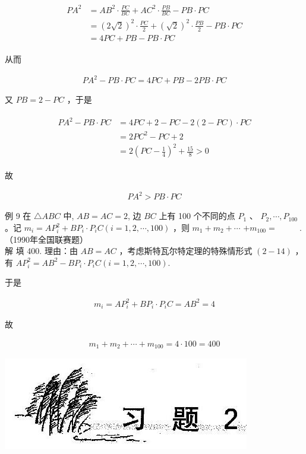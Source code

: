 \documentclass[10pt]{article}
\begin{document}
\begin{align*}
\begin{aligned}
P A^{2} & =A B^{2} \cdot \frac{P C}{B C}+A C^{2} \cdot \frac{P B}{B C}-P B \cdot P C \\
& =(2 \sqrt{2})^{2} \cdot \frac{P C}{2}+(\sqrt{2})^{2} \cdot \frac{P B}{2}-P B \cdot P C \\
& =4 P C+P B-P B \cdot P C
\end{aligned}
\end{align*}

从而

\begin{align*}
P A^{2}-P B \cdot P C=4 P C+P B-2 P B \cdot P C
\end{align*}

又 $P B=2-P C$ ，于是

\begin{align*}
\begin{aligned}
P A^{2}-P B \cdot P C & =4 P C+2-P C-2(2-P C) \cdot P C \\
& =2 P C^{2}-P C+2 \\
& =2\left(P C-\frac{1}{4}\right)^{2}+\frac{15}{8}>0
\end{aligned}
\end{align*}

故

\begin{align*}
P A^{2}>P B \cdot P C
\end{align*}

例 9 在 $\triangle A B C$ 中, $A B=A C=2$, 边 $B C$ 上有 100 个不同的点 $P_{1}$ 、 $P_{2}, \cdots, P_{100}$ 。记 $m_{i}=A P_{i}^{2}+B P_{i} \cdot P_{i} C(i=1,2, \cdots, 100)$ ，则 $m_{1}+m_{2}+\cdots$ $+m_{100}=$ $\qquad$ .（1990年全国联赛题）\\
解 填 400. 理由：由 $A B=A C$ ，考虑斯特瓦尔特定理的特殊情形式 $(2-14)$ ，有 $A P_{i}^{2}=A B^{2}-B P_{i} \cdot P_{i} C(i=1,2, \cdots, 100)$.

于是

\begin{align*}
m_{i}=A P_{i}^{2}+B P_{i} \cdot P_{i} C=A B^{2}=4
\end{align*}

故

\begin{align*}
m_{1}+m_{2}+\cdots+m_{100}=4 \cdot 100=400
\end{align*}

\begin{center}
\includegraphics[max width=\textwidth]{2024_10_30_2c8f45efd4a519b08e1ag-022}
\end{center}
\end{document}
